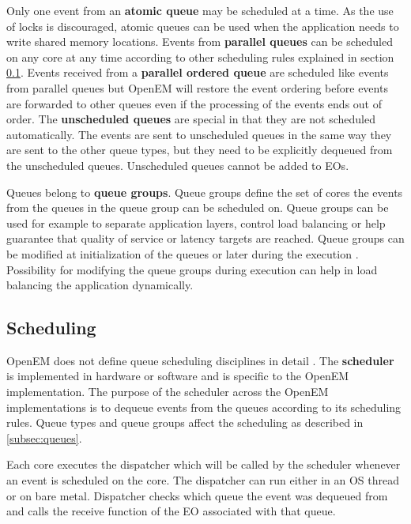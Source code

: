 Only one event from an \textbf{atomic queue} may be scheduled at a time. As the
use of locks is discouraged, atomic queues can be used when the application
needs to write shared memory locations. Events from \textbf{parallel queues} can
be scheduled on any core at any time according to other scheduling rules
explained in section \ref{subsec:schedule}. Events received from a
\textbf{parallel ordered queue} are scheduled like events from parallel queues
but OpenEM will restore the event ordering before events are forwarded to other
queues even if the processing of the events ends out of order. The
\textbf{unscheduled queues} are special in that they are not scheduled
automatically. The events are sent to unscheduled queues in the same way they
are sent to the other queue types, but they need to be explicitly dequeued from
the unscheduled queues. Unscheduled queues cannot be added to EOs.
\cite{openempage}

Queues belong to \textbf{queue groups}. Queue groups define the set of cores
the events from the queues in the queue group can be scheduled on. Queue groups
can be used for example to separate application layers, control load balancing
or help guarantee that quality of service or latency targets are reached.
\cite{openemintro} Queue groups can be modified at initialization of the queues
or later during the execution \cite{openempage}. Possibility for modifying the
queue groups during execution can help in load balancing the application
dynamically.

\subsection{Scheduling}
\label{subsec:schedule}
OpenEM does not define queue scheduling disciplines in detail
\cite{openempage}. The \textbf{scheduler} is implemented in hardware or
software and is specific to the OpenEM implementation. The purpose of the
scheduler across the OpenEM implementations is to dequeue events from the
queues according to its scheduling rules. \cite{openemintro} Queue types and
queue groups affect the scheduling as described in \ref{subsec:queues}.

Each core executes the dispatcher which will be called by the scheduler
whenever an event is scheduled on the core. The dispatcher can run either in an
OS thread or on bare metal. Dispatcher checks which queue the event was
dequeued from and calls the receive function of the EO associated with that
queue. \cite{openemintro}

